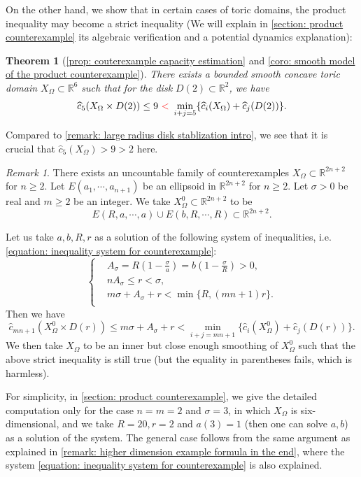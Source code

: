 \documentclass[11pt]{amsart}
\numberwithin{equation}{section}
\theoremstyle{plain}
\newtheorem{Thm}{Theorem}[section]
\theoremstyle{definition}
\theoremstyle{remark}
\newtheorem{RMK}[rmk]{Remark}
\newcommand{\bR} { {\mathbb{R}}}
\begin{document}
 
    





On the other hand, we show that in certain cases of toric domains, the product inequality may become a strict inequality (We will explain in \autoref{section: product counterexample} its algebraic verification and a potential dynamics explanation):
\begin{Thm}[{\autoref{prop: couterexample capacity estimation} and \autoref{coro: smooth model of the product counterexample}}]\label{Thm: counterexample intro}There exists a bounded smooth concave toric domain $X_\Omega\subset \bR^6$ such that for the disk $D(2)\subset \bR^2$, we have
\[\widehat{c}_5(X_\Omega \times D(2)) \leq 9 ~{\color{red}<}~  \min_{i+j=5}\{\widehat{c}_i(X_\Omega) + \widehat{c}_j(D(2))\}.\]  
\end{Thm}
Compared to \autoref{remark: large radius disk stablization intro}, we see that it is crucial that $\widehat{c}_5(X_\Omega)>9>2$ here.
 
\begin{RMK}\label{remark: higher dimension example formula}There exists an uncountable family of counterexamples $X_\Omega\subset \bR^{2n+2}$ for $n\geq 2$. 
Let $E(a_1,\cdots,a_{n+1})$ be an ellipsoid in $\bR^{2n+2}$ for $n\geq 2$. Let $\sigma>0$ be real and $m\geq 2$ be an integer.  
We take $X_\Omega^0\subset \bR^{2n+2}$ to be 
\[E(R,a,\cdots,a)\cup E(b,R,\cdots,R) \subset \bR^{2n+2}.\]

Let us take $a,b,R,r$ as a solution of the following system of inequalities, i.e. \autoref{equation: inequality system for counterexample}:
\begin{equation*}
    \begin{cases}
&A_\sigma =  R\left(1-\frac{\sigma}{a}\right)
=b\left(1-\frac{\sigma}{R}\right)>0,\\
&nA_\sigma\leq r<\sigma,\\
& m\sigma+A_\sigma+r
<\min\{R,(mn+1)r\}.\\
    \end{cases}
\end{equation*}
Then we have
\[
\widehat{c}_{mn+1}(X_\Omega^0\times D(r))
\leq m\sigma+A_\sigma+r
< 
\min_{i+j=mn+1}
\{
\widehat{c}_i(X_\Omega^0)+\widehat{c}_j(D(r))
\}.
\]
We then take $X_\Omega$ to be an inner but close enough smoothing of $X_\Omega^0$ such that the above strict inequality is still true (but the equality in parentheses fails, which is harmless).


For simplicity, in \autoref{section: product counterexample}, we give the detailed computation only
for the case $n=m=2$ and $\sigma= 3$,  in which $X_\Omega$
is six-dimensional, and we take $R=20,r=2$ and $a(3)=1$ (then one can solve $a,b$) as a solution of the system. The general case follows from the same argument as explained in \autoref{remark: higher dimension example formula in the end}, where the system \autoref{equation: inequality system for counterexample} is also explained.
\end{RMK}
\end{document}
